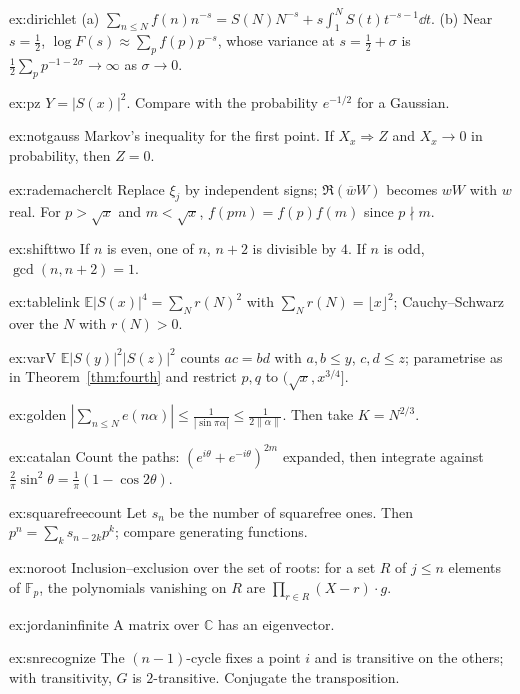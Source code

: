 \begin{hint}{ex:dirichlet}
(a) $\sum_{n\le N}f(n)n^{-s}=S(N)N^{-s}+s\int_1^NS(t)t^{-s-1}\dd t$. (b) Near $s=\frac12$, $\log F(s)\approx\sum_pf(p)p^{-s}$, whose variance at $s=\frac12+\sigma$ is $\frac12\sum_pp^{-1-2\sigma}\to\infty$ as $\sigma\to0$.
\end{hint}
\begin{hint}{ex:pz}
$Y=|S(x)|^2$. Compare with the probability $e^{-1/2}$ for a Gaussian.
\end{hint}
\begin{hint}{ex:notgauss}
Markov's inequality for the first point. If $X_x\Rightarrow Z$ and $X_x\to0$ in probability, then $Z=0$.
\end{hint}
\begin{hint}{ex:rademacherclt}
Replace $\xi_j$ by independent signs; $\Re(\overline wW)$ becomes $wW$ with $w$ real. For $p>\sqrt x$ and $m<\sqrt x$, $f(pm)=f(p)f(m)$ since $p\nmid m$.
\end{hint}
\begin{hint}{ex:shifttwo}
If $n$ is even, one of $n$, $n+2$ is divisible by $4$. If $n$ is odd, $\gcd(n,n+2)=1$.
\end{hint}
\begin{hint}{ex:tablelink}
$\mathbb E|S(x)|^4=\sum_Nr(N)^2$ with $\sum_Nr(N)=\lfloor x\rfloor^2$; Cauchy--Schwarz over the $N$ with $r(N)>0$.
\end{hint}
\begin{hint}{ex:varV}
$\mathbb E|S(y)|^2|S(z)|^2$ counts $ac=bd$ with $a,b\le y$, $c,d\le z$; parametrise as in Theorem~\ref{thm:fourth} and restrict $p,q$ to $(\sqrt x,x^{3/4}]$.
\end{hint}

\begin{hint}{ex:golden}
$|\sum_{n\le N}e(n\alpha)|\le\frac1{|\sin\pi\alpha|}\le\frac1{2\|\alpha\|}$. Then take $K=N^{2/3}$.
\end{hint}
\begin{hint}{ex:catalan}
Count the paths: $(e^{i\theta}+e^{-i\theta})^{2m}$ expanded, then integrate against $\frac2\pi\sin^2\theta=\frac1\pi(1-\cos2\theta)$.
\end{hint}
\begin{hint}{ex:squarefreecount}
Let $s_n$ be the number of squarefree ones. Then $p^n=\sum_ks_{n-2k}p^k$; compare generating functions.
\end{hint}
\begin{hint}{ex:noroot}
Inclusion--exclusion over the set of roots: for a set $R$ of $j\le n$ elements of $\mathbb F_p$, the polynomials vanishing on $R$ are $\prod_{r\in R}(X-r)\cdot g$.
\end{hint}
\begin{hint}{ex:jordaninfinite}
A matrix over $\mathbb C$ has an eigenvector.
\end{hint}
\begin{hint}{ex:snrecognize}
The $(n-1)$-cycle fixes a point $i$ and is transitive on the others; with transitivity, $G$ is $2$-transitive. Conjugate the transposition.
\end{hint}

